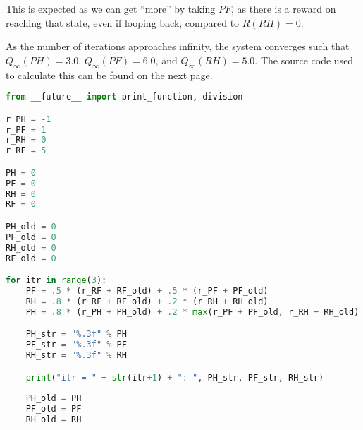 \documentclass[12pt]{article}
\begin{document}
\begin{enumerate}
This is expected as we can get ``more'' by taking $PF$, as there is a reward on reaching that state, even if looping back, compared to $R(RH) = 0$. 

As the number of iterations approaches infinity, the system converges such that $Q_{\infty}(PH) = 3.0$, $Q_{\infty}(PF) = 6.0$, and $Q_{\infty}(RH) = 5.0$. The source code used to calculate this can be found on the next page.

\newpage

\begin{lstlisting}[language=Python]
from __future__ import print_function, division

r_PH = -1
r_PF = 1
r_RH = 0
r_RF = 5

PH = 0
PF = 0
RH = 0
RF = 0

PH_old = 0
PF_old = 0
RH_old = 0
RF_old = 0

for itr in range(3):
    PF = .5 * (r_RF + RF_old) + .5 * (r_PF + PF_old)
    RH = .8 * (r_RF + RF_old) + .2 * (r_RH + RH_old)
    PH = .8 * (r_PH + PH_old) + .2 * max(r_PF + PF_old, r_RH + RH_old)

    PH_str = "%.3f" % PH
    PF_str = "%.3f" % PF
    RH_str = "%.3f" % RH

    print("itr = " + str(itr+1) + ": ", PH_str, PF_str, RH_str)
    
    PH_old = PH
    PF_old = PF
    RH_old = RH

\end{lstlisting}


\end{enumerate}
\end{document}
